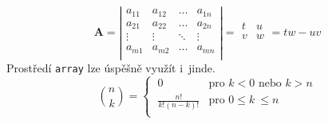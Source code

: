 \documentclass[a4paper, titlepage, twocolumn, 11pt]{article}
\theoremstyle{definition}
\theoremstyle{sentence}
\begin{document}
$$\textbf{A}=\left|\begin{array}{cccc} a_{11}&a_{12}&\ldots&a_{1n}\\
a_{21}&a_{22}&\ldots&a_{2n}\\
\vdots&\vdots&\ddots&\vdots\\
a_{m1}&a_{m2}&\ldots&a_{mn}\\
\end{array}\right|=\begin{array}{cc} t&u\\
v&w\\
\end{array}=tw-uv$$
Prostředí \verb|array| lze úspěšně využít i~jinde.
$$\binom{n}{k}=
\begin{cases}
\ 0& \text{pro } k < 0 \text{ nebo }k > n\\
\ \frac{n!}{k!(n-k)!} & \text{pro } 0 \leq k\:\leq n\\
\end{cases}$$
\end{document}
